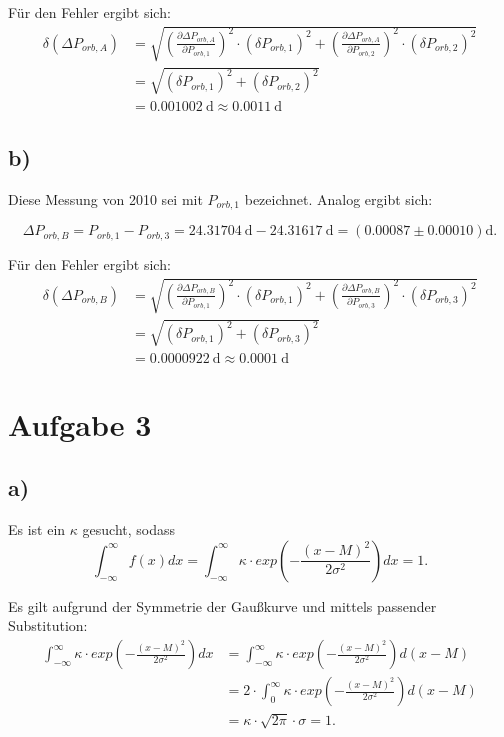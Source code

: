 \documentclass[titlepage]{scrartcl}
\begin{document}
Für den Fehler ergibt sich: 
\begin{align}
\delta (\Delta P_{orb,A}) &= \sqrt{(\frac{\partial \Delta P_{orb,A}}{\partial P_{orb, 1}})^2 \cdot (\delta P_{orb, 1})^2 + (\frac{\partial \Delta P_{orb,A}}{\partial P_{orb, 2}})^2 \cdot (\delta P_{orb, 2})^2} \nonumber\\&= \sqrt{(\delta P_{orb, 1})^2 + (\delta P_{orb, 2})^2} \nonumber\\&= 0.001002 \ \mathrm{d} \approx 0.0011\ \mathrm{d}
\end{align}

\subsection{b)}
Diese Messung von 2010 sei mit $P_{orb, 1}$ bezeichnet. 
Analog ergibt sich: 

\begin{equation}
\Delta P_{orb,B} = P_{orb, 1} - P_{orb, 3} = 24.31704\ \mathrm{d} - 24.31617 \ \mathrm{d} = (0.00087 \pm 0.00010) \mathrm{d}.
\end{equation}

Für den Fehler ergibt sich: 
\begin{align}
\delta (\Delta P_{orb,B}) &= \sqrt{(\frac{\partial \Delta P_{orb,B}}{\partial P_{orb, 1}})^2 \cdot (\delta P_{orb, 1})^2 + (\frac{\partial \Delta P_{orb,B}}{\partial P_{orb, 3}})^2 \cdot (\delta P_{orb, 3})^2} \nonumber\\&= \sqrt{(\delta P_{orb, 1})^2 + (\delta P_{orb, 3})^2} \nonumber\\&= 0.0000922\ \mathrm{d} \approx 0.0001 \ \mathrm{d}
\end{align}

\section{Aufgabe 3}
\subsection{a)}
Es ist ein $\kappa$ gesucht, sodass
\begin{equation}
\int_{-\infty}^{\infty} f(x) dx = \int_{-\infty}^{\infty} \kappa \cdot exp(-\frac{(x-M)^2}{2\sigma^2}) dx = 1.
\end{equation}

Es gilt aufgrund der Symmetrie der Gaußkurve und mittels passender Substitution:
\begin{align}
\int_{-\infty} ^{\infty} \kappa \cdot exp(-\frac{(x-M)^2}{2\sigma^2}) dx &= \int_{-\infty} ^{\infty} \kappa \cdot exp(-\frac{(x-M)^2}{2\sigma^2}) d(x-M) \nonumber\\&= 2 \cdot \int_{0} ^{\infty} \kappa \cdot exp(-\frac{(x-M)^2}{2\sigma^2}) d(x-M) \nonumber\\&= \kappa \cdot \sqrt {2\pi} \cdot \sigma = 1. 
\end{align}
\end{document}
